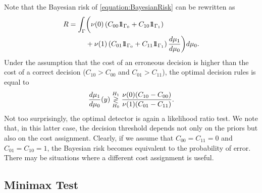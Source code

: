 Note that the Bayesian risk of \eqref{equation:BayesianRisk} can be rewritten as
\begin{equation*}
\begin{split}
R = \int_{\Gamma} & \bigg( \nu (0) \left( C_{00} \SetIn_{ \Gamma_0 }
+ C_{10} \SetIn_{ \Gamma_1 } \right) \\
&+ \nu (1) \left( C_{01} \SetIn_{ \Gamma_0 }
+ C_{11} \SetIn_{ \Gamma_1 } \right)
\frac{d\mu_1}{d\mu_0} \bigg) d\mu_0 .
\end{split}
\end{equation*}
Under the assumption that the cost of an erroneous decision is higher than the cost of a correct decision ($C_{10} > C_{00}$ and $C_{01} > C_{11}$), the optimal decision rules is equal to
\begin{equation*}
\frac{d\mu_1}{d\mu_0} (y)
\overset{H_1}{ \underset{H_0}{\gtrless} }
\frac{\nu(0) (C_{10} - C_{00})}{\nu(1) (C_{01} - C_{11})} .
\end{equation*}
Not too surprisingly, the optimal detector is again a likelihood ratio test.
We note that, in this latter case, the decision threshold depends not only on the priors but also on the cost assignment.
Clearly, if we assume that $C_{00} = C_{11} = 0$ and $C_{01} = C_{10} = 1$, the Bayesian risk becomes equivalent to the probability of error.
There may be situations where a different cost assignment is useful.

\newpage
\subsection{Minimax Test}

